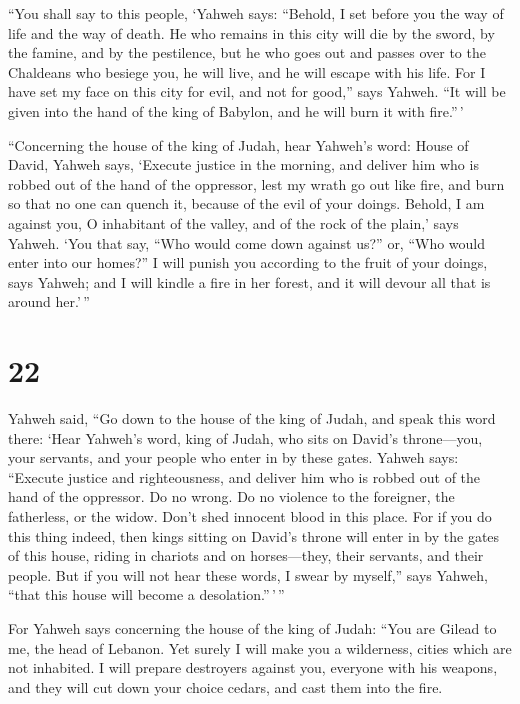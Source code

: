  ``You shall say to this people, `Yahweh says: ``Behold, I
set before you the way of life and the way of death.  He
who remains in this city will die by the sword, by the famine, and by
the pestilence, but he who goes out and passes over to the Chaldeans who
besiege you, he will live, and he will escape with his life.
 For I have set my face on this city for evil, and not
for good,'' says Yahweh. ``It will be given into the hand of the king of
Babylon, and he will burn it with fire.''\,'

 ``Concerning the house of the king of Judah, hear
Yahweh's word:  House of David, Yahweh says, `Execute
justice in the morning, and deliver him who is robbed out of the hand of
the oppressor, lest my wrath go out like fire, and burn so that no one
can quench it, because of the evil of your doings. 
Behold, I am against you, O inhabitant of the valley, and of the rock of
the plain,' says Yahweh. `You that say, ``Who would come down against
us?'' or, ``Who would enter into our homes?''  I will
punish you according to the fruit of your doings, says Yahweh; and I
will kindle a fire in her forest, and it will devour all that is around
her.'\,''

\hypertarget{section-21}{%
\section{22}\label{section-21}}

 Yahweh said, ``Go down to the house of the king of Judah,
and speak this word there:  `Hear Yahweh's word, king of
Judah, who sits on David's throne---you, your servants, and your people
who enter in by these gates.  Yahweh says: ``Execute
justice and righteousness, and deliver him who is robbed out of the hand
of the oppressor. Do no wrong. Do no violence to the foreigner, the
fatherless, or the widow. Don't shed innocent blood in this place.
 For if you do this thing indeed, then kings sitting on
David's throne will enter in by the gates of this house, riding in
chariots and on horses---they, their servants, and their people.
 But if you will not hear these words, I swear by
myself,'' says Yahweh, ``that this house will become a
desolation.''\,'\,''

 For Yahweh says concerning the house of the king of
Judah: ``You are Gilead to me, the head of Lebanon. Yet surely I will
make you a wilderness, cities which are not inhabited.  I
will prepare destroyers against you, everyone with his weapons, and they
will cut down your choice cedars, and cast them into the fire.

